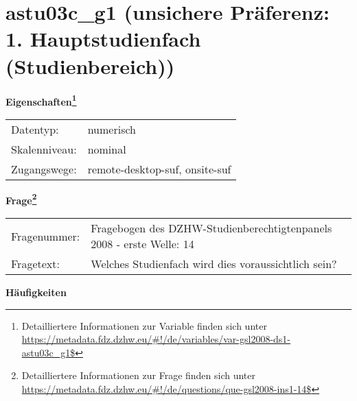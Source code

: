
    \setcounter{footnote}{0}

    \vspace*{-1.8cm}
	\section{astu03c\_g1 (unsichere Präferenz: 1. Hauptstudienfach (Studienbereich))}
	\label{section:astu03c_g1}



    \vspace*{0.5cm}
    \noindent\textbf{Eigenschaften\footnote{Detailliertere Informationen zur Variable finden sich unter
		\url{https://metadata.fdz.dzhw.eu/\#!/de/variables/var-gsl2008-ds1-astu03c_g1$}}}\\
	\begin{tabularx}{\hsize}{@{}lX}
	Datentyp: & numerisch \\
	Skalenniveau: & nominal \\
	Zugangswege: &
	  remote-desktop-suf, 
	  onsite-suf
 \\
    \end{tabularx}



				\vspace*{0.5cm}
                \noindent\textbf{Frage\footnote{Detailliertere Informationen zur Frage finden sich unter
		              \url{https://metadata.fdz.dzhw.eu/\#!/de/questions/que-gsl2008-ins1-14$}}}\\
				\begin{tabularx}{\hsize}{@{}lX}
					Fragenummer: &
					  Fragebogen des DZHW-Studienberechtigtenpanels 2008 - erste Welle:
					  14
 \\
					Fragetext: & Welches Studienfach wird dies voraussichtlich sein? \\
				\end{tabularx}





        		\vspace*{0.5cm}
                \noindent\textbf{Häufigkeiten}

